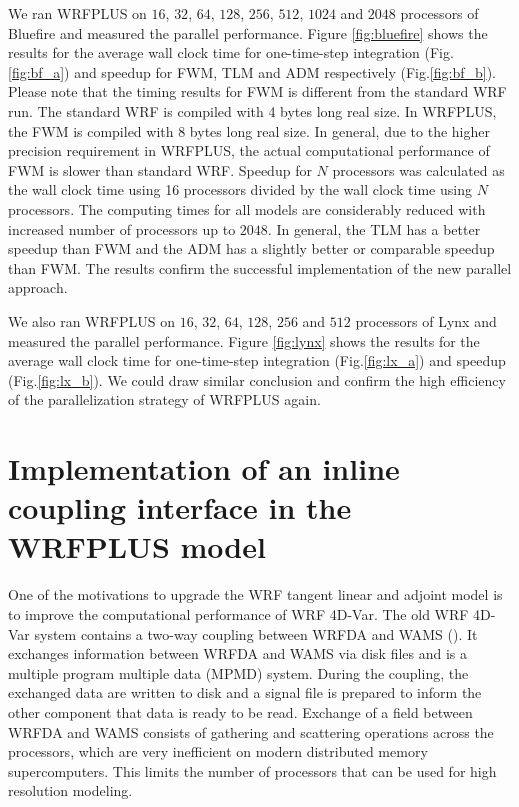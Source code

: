 \documentclass[12pt]{article}
\begin{document}
We ran WRFPLUS on $16$, $32$, $64$, $128$, $256$, $512$, $1024$ and $2048$ processors of Bluefire and measured the parallel performance. Figure \ref{fig:bluefire} shows the results for the average wall clock time for one-time-step integration (Fig.\ref{fig:bf_a}) and speedup for FWM, TLM and ADM respectively (Fig.\ref{fig:bf_b}). Please note that the timing results for FWM is different from the standard WRF run. The standard WRF is compiled with 4 bytes long real size. In WRFPLUS, the FWM is compiled with 8 bytes long real size. In general, due to the higher precision requirement in WRFPLUS, the actual computational performance of FWM is slower than standard WRF. Speedup for $N$ processors was calculated as the wall clock time using 16 processors divided by the wall clock time using $N$ processors. The computing times for all models are considerably reduced with increased number of processors up to $2048$. In general, the TLM has a better speedup than FWM and the ADM has a slightly better or comparable speedup than FWM. The results confirm the successful implementation of the new parallel approach. 

We also ran WRFPLUS on $16$, $32$, $64$, $128$, $256$ and $512$ processors of Lynx and measured the parallel performance. Figure \ref{fig:lynx} shows the results for the average wall clock time for one-time-step integration (Fig.\ref{fig:lx_a}) and speedup (Fig.\ref{fig:lx_b}). We could draw similar conclusion and confirm the high efficiency of the parallelization strategy of WRFPLUS again.

\section{Implementation of an inline coupling interface in the WRFPLUS model}

One of the motivations to upgrade the WRF tangent linear and adjoint model is to improve the computational performance of WRF 4D-Var. The old WRF 4D-Var system contains a two-way coupling between WRFDA and WAMS (\cite{Huang2009}). It exchanges information between WRFDA  and WAMS via disk files and is a multiple program multiple data (MPMD) system. During the coupling, the exchanged data are written to disk and a signal file is prepared to inform the other component that data is ready to be read. Exchange of a field between WRFDA and WAMS consists of gathering and scattering operations across the processors, which are very inefficient on modern distributed memory supercomputers. This limits the number of processors that can be used for high resolution modeling.
\end{document}
